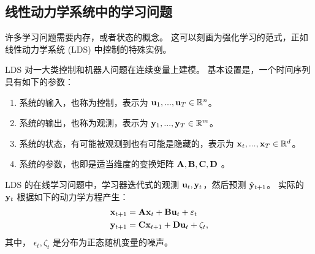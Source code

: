 \subsection{
    线性动力学系统中的学习问题
    } 


许多学习问题需要内存，或者状态的概念。
这可以刻画为强化学习的范式，正如线性动力学系统 (LDS) 中控制的特殊实例。

LDS 对一大类控制和机器人问题在连续变量上建模。
基本设置是，一个时间序列具有如下的参数：
\begin{enumerate}
\item
系统的输入，也称为控制，表示为  $\mathbf u_1,...,\mathbf u_T \in {\mathbb R}^n$。
\item
系统的输出，也称为观测，表示为 $\mathbf y_1,...,\mathbf y_T \in {\mathbb R}^m$。
\item
系统的状态，有可能被观测到也有可能是隐藏的，表示为  $\mathbf x_t,...,\mathbf x_T \in {\mathbb R}^d$。
\item
系统的参数，也即是适当维度的变换矩阵 $\mathbf{A},\mathbf{B},\mathbf{C},\mathbf{D}$ 。
\end{enumerate}


LDS 的在线学习问题中，学习器迭代式的观测  $\mathbf u_t,\mathbf y_t$，然后预测  $\hat{\mathbf y}_{t+1}$。
实际的 $\mathbf y_t$ 根据如下的动力学方程产生：
\begin{align*}
& \mathbf x_{t+1} = \mathbf{A} \mathbf x_t + \mathbf{B} \mathbf u_t + \varepsilon_t \\
& \mathbf y_{t+1} = \mathbf{C} \mathbf x_{t+1} + \mathbf{D} \mathbf u_t + \zeta_t  , 
\end{align*}
其中， $\epsilon_t,\zeta_t$ 是分布为正态随机变量的噪声。


